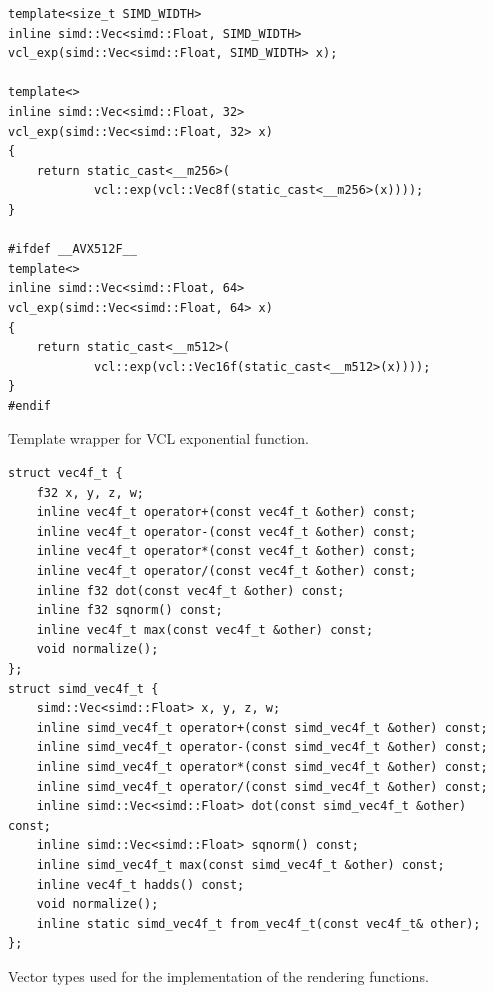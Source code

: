 \documentclass[a4paper, 11pt]{memoir}
\begin{document}
    \begin{listing}[ht]
        \begin{verbatim}
template<size_t SIMD_WIDTH>
inline simd::Vec<simd::Float, SIMD_WIDTH>
vcl_exp(simd::Vec<simd::Float, SIMD_WIDTH> x);

template<>
inline simd::Vec<simd::Float, 32>
vcl_exp(simd::Vec<simd::Float, 32> x)
{
    return static_cast<__m256>(
            vcl::exp(vcl::Vec8f(static_cast<__m256>(x))));
}

#ifdef __AVX512F__
template<>
inline simd::Vec<simd::Float, 64>
vcl_exp(simd::Vec<simd::Float, 64> x)
{
    return static_cast<__m512>(
            vcl::exp(vcl::Vec16f(static_cast<__m512>(x))));
}
#endif
        \end{verbatim}
        \caption{Template wrapper for VCL exponential function.}
        \label{lst:vcl_exp}
    \end{listing}

    \begin{listing}[ht]
        \begin{verbatim}
struct vec4f_t {
    f32 x, y, z, w;
    inline vec4f_t operator+(const vec4f_t &other) const;
    inline vec4f_t operator-(const vec4f_t &other) const;
    inline vec4f_t operator*(const vec4f_t &other) const;
    inline vec4f_t operator/(const vec4f_t &other) const;
    inline f32 dot(const vec4f_t &other) const;
    inline f32 sqnorm() const;
    inline vec4f_t max(const vec4f_t &other) const;
    void normalize();
};
struct simd_vec4f_t {
    simd::Vec<simd::Float> x, y, z, w;
    inline simd_vec4f_t operator+(const simd_vec4f_t &other) const;
    inline simd_vec4f_t operator-(const simd_vec4f_t &other) const;
    inline simd_vec4f_t operator*(const simd_vec4f_t &other) const;
    inline simd_vec4f_t operator/(const simd_vec4f_t &other) const;
    inline simd::Vec<simd::Float> dot(const simd_vec4f_t &other) const;
    inline simd::Vec<simd::Float> sqnorm() const;
    inline simd_vec4f_t max(const simd_vec4f_t &other) const;
    inline vec4f_t hadds() const;
    void normalize();
    inline static simd_vec4f_t from_vec4f_t(const vec4f_t& other);
};
        \end{verbatim}
        \caption{Vector types used for the implementation of the rendering functions.}
        \label{lst:vec_types_vrt_full}
    \end{listing}
\end{document}
